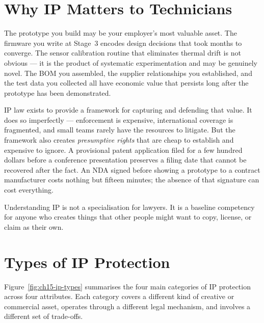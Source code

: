 \section{Why IP Matters to Technicians}
\label{sec:ch15-why}

The prototype you build may
be your employer's most valuable asset.
The firmware you write at Stage~3 encodes design decisions that took months to
converge.
The sensor calibration routine that eliminates thermal drift is not obvious --- it
is the product of systematic experimentation and may be genuinely novel.
The BOM you assembled, the supplier relationships you established, and the test
data you collected all have economic value that persists long after the prototype
has been demonstrated.

IP law exists to provide a framework for capturing and defending that value.
It does so imperfectly --- enforcement is expensive, international coverage is
fragmented, and small teams rarely have the resources to litigate.
But the framework also creates \emph{presumptive rights} that are cheap to
establish and expensive to ignore.
A provisional patent application filed for a few hundred dollars before a
conference presentation preserves a filing date that cannot be recovered after the
fact.
An NDA signed before showing a prototype to a contract manufacturer costs nothing
but fifteen minutes; the absence of that signature can cost everything.

Understanding IP is not a specialisation for lawyers.
It is a baseline competency for anyone who creates things that other people might
want to copy, license, or claim as their own.

\section{Types of IP Protection}
\label{sec:ch15-types}

Figure~\ref{fig:ch15-ip-types} summarises the four main categories of IP
protection across four attributes.
Each category covers a different kind of creative or commercial asset, operates
through a different legal mechanism, and involves a different set of trade-offs.

